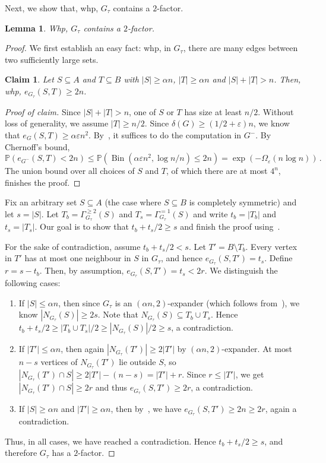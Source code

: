 \documentclass[reqno,final,a4paper]{amsart}
\numberwithin{equation}{section}
\newtheorem{lemma}[theorem]{Lemma}
\newtheorem{claim}[theorem]{Claim}
\theoremstyle{definition}
\theoremstyle{remark}
\renewcommand{\Pr}{\mathbb{P}}
\newcommand{\eps}{\varepsilon}
\newcommand{\Bin}{\operatorname{Bin}}
\newenvironment{proofclaim}[1][Proof of claim]{\begin{proof}[#1]\renewcommand*{\qedsymbol}{\(\blacksquare\)}}{\end{proof}}
\begin{document}
Next, we show that, whp, $G_\tau$ contains a $2$-factor. 
\begin{lemma}\label{lem:2-factor-exists}
    Whp, $G_\tau$ contains a $2$-factor.    
\end{lemma}
\begin{proof}
    We first establish an easy fact: whp, in $G_\tau$, there are many edges between two sufficiently large sets.
    \begin{claim}\label{cla:many-edges}
        Let $S\subseteq A$ and $T\subseteq B$ with $|S|\geq \alpha n$, $|T|\geq \alpha n$ and $|S|+|T| > n$. Then, whp, $e_{G_\tau}(S,T)\geq 2n$. 
    \end{claim}
    \begin{proofclaim}
        Since $|S|+|T|>n$, one of $S$ or $T$ has size at least $n/2$. Without loss of generality, we assume $|T|\geq n/2$. Since $\delta(G) \geq (1/2 + \eps)n$, we know that $e_G(S, T)\geq \alpha \eps n^2$. 
        By~, it suffices to do the computation in $G^-$.
        By Chernoff's bound,
        \[
            \Pr(e_{G^-}(S,T) < 2n)\leq \Pr(\Bin(\alpha\eps n^2, \log n/n) \leq 2n) = \exp(-\Omega_\eps(n\log n))\,.
        \]
        The union bound over all choices of $S$ and $T$, of which there are at most $4^n$, finishes the proof.
    \end{proofclaim}
    Fix an arbitrary set $S \subseteq A$ (the case where $S\subseteq B$ is completely symmetric) and let $s = |S|$.
    Let $T_b = \Gamma^{\geq 2}_{G_\tau}(S)$ and $T_s = \Gamma^{=1}_{G_\tau}(S)$ and write $t_b = |T_b|$ and $t_s = |T_s|$. Our goal is to show that $t_b + t_s/2 \geq s$ and finish the proof using~.
    
    For the sake of contradiction, assume $t_b + t_s/2 < s$. Let $T' = B\setminus T_b$. Every vertex in $T'$ has at most one neighbour in $S$ in $G_\tau$, and hence $e_{G_\tau}(S,T') = t_s$. Define $r = s-t_b$. Then, by assumption, $e_{G_\tau}(S,T') = t_s < 2r$. We distinguish the following cases:
    \begin{enumerate}
        \item If $|S|\leq \alpha n$, then since $G_\tau$ is an $(\alpha n,2)$-expander (which follows from~), we know $|N_{G_\tau}(S)|\geq 2s$. Note that $N_{G_\tau}(S)\subseteq T_b\cup T_s$. Hence $t_b + t_s/2\geq |T_b\cup T_s|/2 \geq |N_{G_\tau}(S)|/2 \geq s$, a contradiction.
        \item If $|T'|\leq \alpha n$, then again $|N_{G_\tau}(T')|\geq 2|T'|$ by $(\alpha n,2)$-expander. At most $n - s$ vertices of $N_{G_\tau}(T')$ lie outside $S$, so $|N_{G_\tau}(T')\cap S|\geq 2|T'| - (n-s) = |T'| + r$. Since $r\leq |T'|$, we get $|N_{G_\tau}(T')\cap S|\geq 2r$ and thus $e_{G_\tau}(S,T')\geq 2r$, a contradiction.
        \item If $|S|\geq \alpha n$ and $|T'|\geq \alpha n$, then by~, we have $e_{G_\tau}(S, T')\geq 2n\geq 2r$, again a contradiction.
    \end{enumerate}
    Thus, in all cases, we have reached a contradiction. Hence $t_b+t_s/2\geq s$, and therefore $G_\tau$ has a $2$-factor.
\end{proof}
\end{document}
